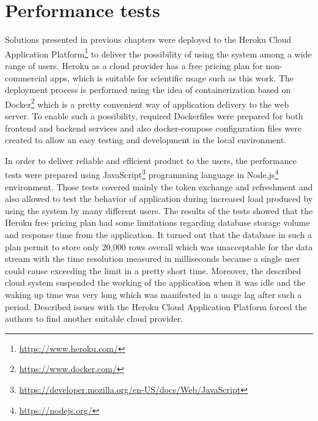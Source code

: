 \section{Performance tests}\label{sec:performance-tests}
Solutions presented in previous chapters were deployed to the Heroku Cloud Application Platform\footnote{\url{https://www.heroku.com/}} to deliver the possibility of using the system among a wide range of users.
Heroku as a cloud provider has a free pricing plan for non-commercial apps, which is suitable for scientific usage such as this work.
The deployment process is performed using the idea of containerization based on Docker\footnote{\url{https://www.docker.com/}} which is a pretty convenient way of application delivery to the web server.
To enable such a possibility, required Dockerfiles were prepared for both frontend and backend services and also docker-compose configuration files were created to allow an easy testing and development in the local environment.

In order to deliver reliable and efficient product to the users, the performance tests were prepared using JavaScript\footnote{\url{https://developer.mozilla.org/en-US/docs/Web/JavaScript}} programming language in Node.js\footnote{\url{https://nodejs.org/}} environment.
Those tests covered mainly the token exchange and refreshment and also allowed to test the behavior of application during increased load produced by using the system by many different users.
The results of the tests showed that the Heroku free pricing plan had some limitations regarding database storage volume and response time from the application.
It turned out that the database in such a plan permit to store only 20,000 rows overall which was unacceptable for the data stream with the time resolution measured in milliseconds because a single user could cause exceeding the limit in a pretty short time.
Moreover, the described cloud system suspended the working of the application when it was idle and the waking up time was very long which was manifested in a usage lag after such a period.
Described issues with the Heroku Cloud Application Platform forced the authors to find another suitable cloud provider.
